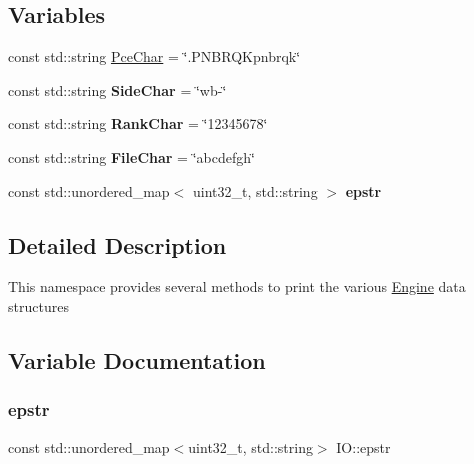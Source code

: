 \subsection*{Variables}
\begin{DoxyCompactItemize}
\item 
const std\+::string \mbox{\hyperlink{namespaceIO_a1c70218e9ea5ec5ff1a2a3e486dc1c9d}{Pce\+Char}} = \char`\"{}.P\+N\+B\+R\+Q\+Kpnbrqk\char`\"{}
\item 
\mbox{\label{namespaceIO_ac0e91e487904b7ef2a84da82dd8163b1}} 
const std\+::string {\bfseries Side\+Char} = \char`\"{}wb-\/\char`\"{}
\item 
\mbox{\label{namespaceIO_aa43c5eefed9ad388801e187fb1c4b9f7}} 
const std\+::string {\bfseries Rank\+Char} = \char`\"{}12345678\char`\"{}
\item 
\mbox{\label{namespaceIO_af411d58290cad5da877276bff7704388}} 
const std\+::string {\bfseries File\+Char} = \char`\"{}abcdefgh\char`\"{}
\item 
const std\+::unordered\+\_\+map$<$ uint32\+\_\+t, std\+::string $>$ {\bfseries epstr}
\end{DoxyCompactItemize}


\subsection{Detailed Description}
This namespace provides several methods to print the various \mbox{\hyperlink{classEngine}{Engine}} data structures 

\subsection{Variable Documentation}
\mbox{\label{namespaceIO_a64af1143e1386143bb867f972b2d2c58}} 
\subsubsection{\texorpdfstring{epstr}{epstr}}
{\footnotesize\ttfamily const std\+::unordered\+\_\+map$<$uint32\+\_\+t, std\+::string$>$ I\+O\+::epstr}

